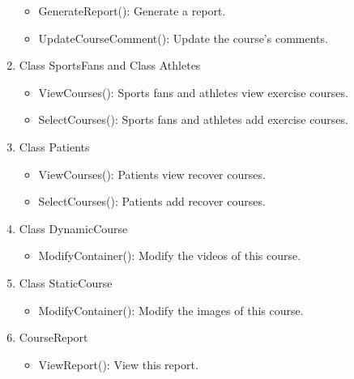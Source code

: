 \documentclass[16pt]{scrreprt}
\begin{document}
\begin{enumerate}
\begin{itemize}
		\item GenerateReport(): Generate a report.
		\item UpdateCourseComment(): Update the course's comments.
	\end{itemize}
	\item Class SportsFans and Class Athletes
	\begin{itemize}
		\item ViewCourses(): Sports fans and athletes view exercise courses.
		\item SelectCourses(): Sports fans and athletes add exercise courses.
	\end{itemize}
	\item Class Patients
	\begin{itemize}
		\item ViewCourses(): Patients view recover courses.
		\item SelectCourses(): Patients add recover courses.
	\end{itemize}
	\item Class DynamicCourse
	\begin{itemize}
		\item ModifyContainer(): Modify the videos of this course.
	\end{itemize}
	\item Class StaticCourse
	\begin{itemize}
		\item ModifyContainer(): Modify the images of this course.
	\end{itemize}
	\item CourseReport
	\begin{itemize}
		\item ViewReport(): View this report.
	\end{itemize}
\end{enumerate}
\end{document}
